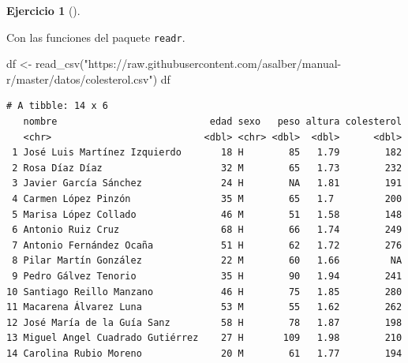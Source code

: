 \documentclass[
  a4paper,
]{scrreport}
\newenvironment{Shaded}{\begin{snugshade}}{\end{snugshade}}
\newcommand{\FunctionTok}[1]{\textcolor[rgb]{0.28,0.35,0.67}{#1}}
\newcommand{\NormalTok}[1]{\textcolor[rgb]{0.00,0.23,0.31}{#1}}
\newcommand{\OtherTok}[1]{\textcolor[rgb]{0.00,0.23,0.31}{#1}}
\newcommand{\StringTok}[1]{\textcolor[rgb]{0.13,0.47,0.30}{#1}}
\theoremstyle{definition}
\newtheorem{exercise}{Ejercicio}[chapter]
\theoremstyle{remark}
\begin{document}
\begin{exercise}[]
\begin{tcolorbox}
\end{tcolorbox}

\begin{tcolorbox}[enhanced jigsaw, breakable, arc=.35mm, leftrule=.75mm, toptitle=1mm, opacitybacktitle=0.6, opacityback=0, title=\textcolor{quarto-callout-tip-color}{\faLightbulb}\hspace{0.5em}{Solución 2}, colframe=quarto-callout-tip-color-frame, titlerule=0mm, bottomtitle=1mm, colback=white, bottomrule=.15mm, colbacktitle=quarto-callout-tip-color!10!white, toprule=.15mm, rightrule=.15mm, left=2mm, coltitle=black]

Con las funciones del paquete \texttt{readr}.

\begin{Shaded}
\begin{Highlighting}[]
\NormalTok{df }\OtherTok{\textless{}{-}} \FunctionTok{read\_csv}\NormalTok{(}\StringTok{"https://raw.githubusercontent.com/asalber/manual{-}r/master/datos/colesterol.csv"}\NormalTok{)}
\NormalTok{df}
\end{Highlighting}
\end{Shaded}

\begin{verbatim}
# A tibble: 14 x 6
   nombre                           edad sexo   peso altura colesterol
   <chr>                           <dbl> <chr> <dbl>  <dbl>      <dbl>
 1 José Luis Martínez Izquierdo       18 H        85   1.79        182
 2 Rosa Díaz Díaz                     32 M        65   1.73        232
 3 Javier García Sánchez              24 H        NA   1.81        191
 4 Carmen López Pinzón                35 M        65   1.7         200
 5 Marisa López Collado               46 M        51   1.58        148
 6 Antonio Ruiz Cruz                  68 H        66   1.74        249
 7 Antonio Fernández Ocaña            51 H        62   1.72        276
 8 Pilar Martín González              22 M        60   1.66         NA
 9 Pedro Gálvez Tenorio               35 H        90   1.94        241
10 Santiago Reillo Manzano            46 H        75   1.85        280
11 Macarena Álvarez Luna              53 M        55   1.62        262
12 José María de la Guía Sanz         58 H        78   1.87        198
13 Miguel Angel Cuadrado Gutiérrez    27 H       109   1.98        210
14 Carolina Rubio Moreno              20 M        61   1.77        194
\end{verbatim}

\end{tcolorbox}


\end{exercise}
\end{document}

